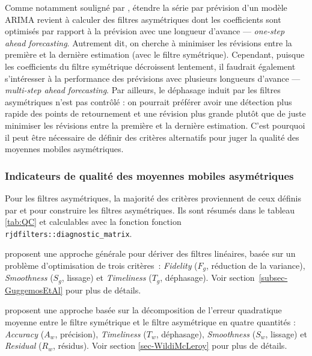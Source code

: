 \documentclass[
  12pt,
  a4paper,french]{article}
\newcommand\1{\mathds{1}}
\begin{document}
Comme notamment souligné par \textcite{wildischis2004}, étendre la série par prévision d'un modèle ARIMA revient à calculer des filtres asymétriques dont les coefficients sont optimisés par rapport à la prévision avec une longueur d'avance --- \emph{one-step ahead forecasting}.
Autrement dit, on cherche à minimiser les révisions entre la première et la dernière estimation (avec le filtre symétrique).
Cependant, puisque les coefficients du filtre symétrique décroissent lentement, il faudrait également s'intéresser à la performance des prévisions avec plusieurs longueurs d'avance --- \emph{multi-step ahead forecasting}.
Par ailleurs, le déphasage induit par les filtres asymétriques n'est pas contrôlé : on pourrait préférer avoir une détection plus rapide des points de retournement et une révision plus grande plutôt que de juste minimiser les révisions entre la première et la dernière estimation.
C'est pourquoi il peut être nécessaire de définir des critères alternatifs pour juger la qualité des moyennes mobiles asymétriques.

\hypertarget{indicateurs-de-qualituxe9-des-moyennes-mobiles-asymuxe9triques}{%
\subsubsection{Indicateurs de qualité des moyennes mobiles asymétriques}\label{indicateurs-de-qualituxe9-des-moyennes-mobiles-asymuxe9triques}}

Pour les filtres asymétriques, la majorité des critères proviennent de ceux définis par \textcite{ch15HBSA} et \textcite{trilemmaWMR2019} pour construire les filtres asymétriques. Ils sont résumés dans le tableau \ref{tab:QC} et calculables avec la fonction fonction \texttt{rjdfilters::diagnostic\_matrix}.

\textcite{ch15HBSA} proposent une approche générale pour dériver des filtres linéaires, basée sur un problème d'optimisation de trois critères~: \emph{Fidelity} (\(F_g\), réduction de la variance), \emph{Smoothness} (\(S_g\), lissage) et \emph{Timeliness} (\(T_g\), déphasage).
Voir section~\ref{subsec-GuggemosEtAl} pour plus de détails.

\textcite{trilemmaWMR2019} proposent une approche basée sur la décomposition de l'erreur quadratique moyenne entre le filtre symétrique et le filtre asymétrique en quatre quantités : \emph{Accuracy} (\(A_w\), précision), \emph{Timeliness} (\(T_w\), déphasage), \emph{Smoothness} (\(S_w\), lissage) et \emph{Residual} (\(R_w\), résidus).
Voir section \ref{sec-WildiMcLeroy} pour plus de détails.
\end{document}
